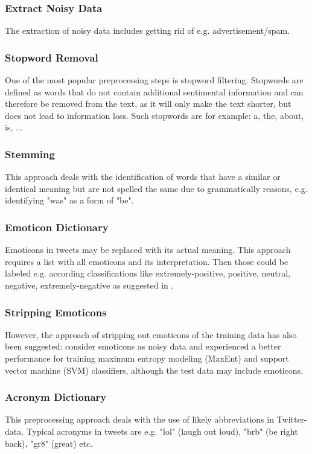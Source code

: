 \documentclass{acm_proc_article-sp}
\begin{document}
\subsubsection{Extract Noisy Data} The extraction of noisy data includes
getting rid of e.g. advertisement/spam.

\subsubsection{Stopword Removal} One of the most popular preprocessing steps is
stopword filtering. Stopwords are defined as words that do not contain
additional sentimental information and can therefore be removed from the text,
as it will only make the text shorter, but does not lead to information loss.
Such stopwords are for example: a, the, about, is, ...

\subsubsection{Stemming} This approach deals with the identification of words
that have a similar or identical meaning but are not spelled the same due to
grammatically reasons, e.g. identifying "was" as a form of "be".

\subsubsection{Emoticon Dictionary} Emoticons in tweets may be replaced with
its actual meaning. This approach requires a list with all emoticons and its
interpretation. Then those could be labeled e.g. according classifications like
extremely-positive, positive, neutral, negative, extremely-negative as
suggested in \cite{agarwal2011sentiment}.

\subsubsection{Stripping Emoticons} However, the approach of stripping out
emoticons of the training data has also been suggested: \cite{go2009twitter}
consider emoticons as noisy data and experienced a better performance for
training maximum entropy modeling (MaxEnt) and support vector machine (SVM)
classifiers, although the test data may include emoticons.

\subsubsection{Acronym Dictionary} This preprocessing approach deals with the
use of likely abbreviations in Twitter-data.  Typical acronyms in tweets are
e.g. "lol" (laugh out loud), "brb" (be right back), "gr8" (great) etc.
\end{document}
